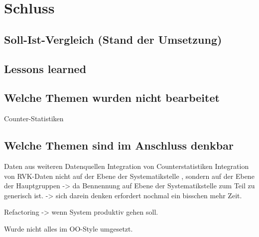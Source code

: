 
\chapter{Schluss}
\label{chap:six}
\section{Soll-Ist-Vergleich (Stand der Umsetzung)}
\section{Lessons learned}
\section{Welche Themen wurden nicht bearbeitet}
Counter-Statistiken

\section{Welche Themen sind im Anschluss denkbar}
Daten aus weiteren Datenquellen
Integration von Counterstatistiken
Integration von RVK-Daten nicht auf der Ebene der Systematikstelle , sondern auf der Ebene
der Hauptgruppen -> da Bennennung auf Ebene der Systematikstelle zum Teil zu generisch ist. 
-> sich darein denken erfordert nochmal ein bisschen mehr Zeit.

Refactoring -> wenn System produktiv gehen soll.

Wurde nicht alles im OO-Style umgesetzt.